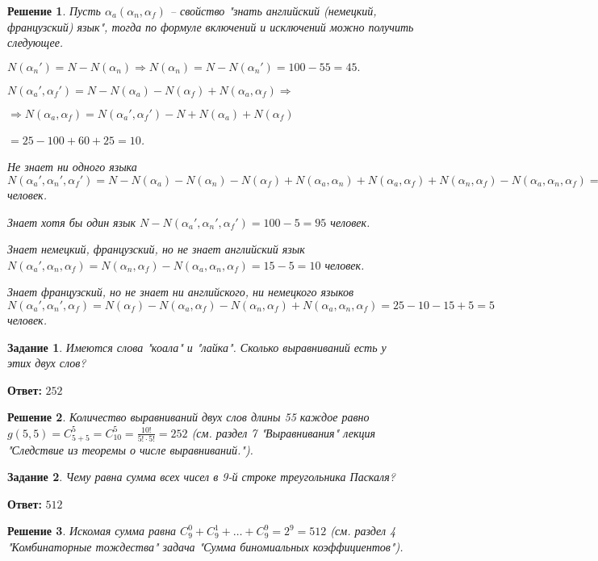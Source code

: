 \documentclass[a4paper,oneside]{memoir}
\newtheorem{task}{Задание}
\newtheorem{solution}{Решение}
\begin{document}
\begin{solution}
	Пусть $ \alpha_a (\alpha_n, \alpha_f) $ -- свойство "знать английский (немецкий, французский) язык", тогда по формуле включений и исключений можно получить следующее.
	
$ 	N(\alpha_n') = N - N(\alpha_n) \Rightarrow N(\alpha_n) = N - N(\alpha_n') = 100-55=45. $ 

	
	$ N(\alpha_a', \alpha_f') = N - N(\alpha_a) - N(\alpha_f)+N(\alpha_a, \alpha_f) \Rightarrow $
	
	$ \Rightarrow N(\alpha_a, \alpha_f) = N(\alpha_a', \alpha_f') - N +N(\alpha_a) + N(\alpha_f) $
	
	$ =25-100+60+25=10 $.
	
	Не знает ни одного языка $ N(\alpha_a', \alpha_n', \alpha_f') = N - N(\alpha_a) - N(\alpha_n) - N(\alpha_f) + N(\alpha_a, \alpha_n) + N(\alpha_a, \alpha_f) + N(\alpha_n, \alpha_f) - N(\alpha_a, \alpha_n, \alpha_f)=100-60-45-25+15+10+15-5=5 $ человек.
	
	Знает хотя бы один язык $ N - N(\alpha_a', \alpha_n', \alpha_f') = 100-5=95 $ человек.
	
	Знает немецкий, французский, но не знает английский язык $ N(\alpha_a', \alpha_n, \alpha_f) = N(\alpha_n, \alpha_f) - N(\alpha_a, \alpha_n, \alpha_f)=15-5=10 $ человек.

	Знает французский, но не знает ни английского, ни немецкого языков $ N(\alpha_a', \alpha_n', \alpha_f) = N(\alpha_f) - N(\alpha_a, \alpha_f) - N(\alpha_n, \alpha_f)+N(\alpha_a, \alpha_n, \alpha_f)=25-10-15+5 = 5 $ человек.
\end{solution}

\hrulefill

\begin{task}
	Имеются слова "коала" и "лайка". Сколько выравниваний есть у этих двух слов?
\end{task}

\textbf{Ответ:} $ 252 $

\begin{solution}
	Количество выравниваний двух слов длины 55 каждое равно $ g(5,5)=C_{5+5}^5 = C_{10}^5 =\frac{10!}{5!\cdot 5!}= 252 $ (см. раздел 7 "Выравнивания" лекция "Следствие из теоремы о числе выравниваний.").
\end{solution}

\hrulefill

\begin{task}
	Чему равна сумма всех чисел в 9-й строке треугольника Паскаля?
\end{task}

\textbf{Ответ:} $ 512 $

\begin{solution}
	Искомая сумма равна $ C_9^0 + C_9^1+\ldots+C_9^9 = 2^9 =512 $ (см. раздел 4 "Комбинаторные тождества" задача "Сумма биномиальных коэффициентов").
\end{solution}
\end{document}
